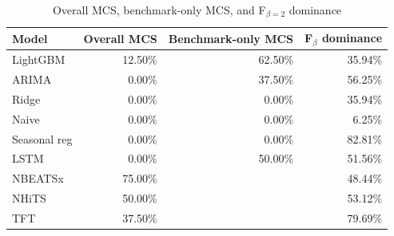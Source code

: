 \begin{table}
\caption{Overall MCS, benchmark-only MCS, and F$_{\beta=2}$ dominance}
\begin{tabular}{lrrr}
\toprule
Model & Overall MCS & Benchmark-only MCS & F$_{\beta}$ dominance \\
\midrule
LightGBM & 12.50\% & 62.50\% & 35.94\% \\
ARIMA & 0.00\% & 37.50\% & 56.25\% \\
Ridge & 0.00\% & 0.00\% & 35.94\% \\
Naive & 0.00\% & 0.00\% & 6.25\% \\
Seasonal reg & 0.00\% & 0.00\% & 82.81\% \\
LSTM & 0.00\% & 50.00\% & 51.56\% \\
NBEATSx & 75.00\% &  & 48.44\% \\
NHiTS & 50.00\% &  & 53.12\% \\
TFT & 37.50\% &  & 79.69\% \\
\bottomrule
\end{tabular}
\end{table}
